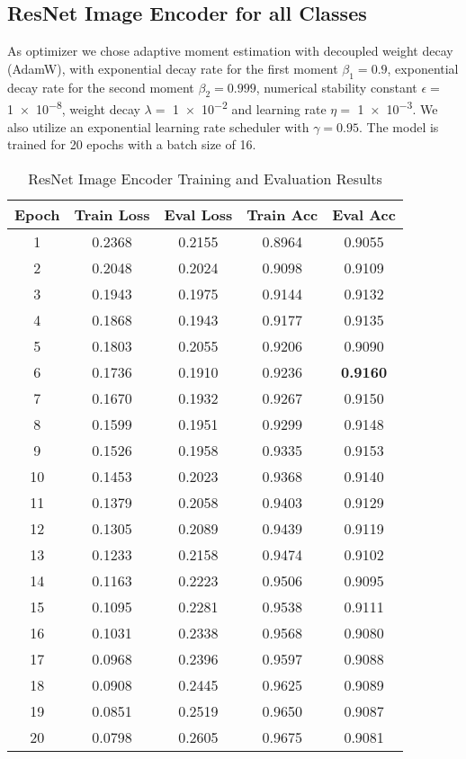 \documentclass{article}
\begin{document}
\subsection{ResNet Image Encoder for all Classes}
As optimizer we chose adaptive moment estimation with decoupled weight decay (AdamW),
with exponential decay rate for the first moment $\beta_1=0.9$, exponential decay rate for the second moment $\beta_2= 0.999$,
numerical stability constant $\epsilon =$ \num{1e-8}, weight decay $\lambda=$ \num{1e-2} and learning rate $\eta=$ \num{1e-3}.
We also utilize an exponential learning rate scheduler with $\gamma=0.95$. 
The model is trained for 20 epochs with a batch size of 16.
\begin{table}[H]
    \centering
    \caption{ResNet Image Encoder Training and Evaluation Results}
    \begin{tabular}{c|c|c|c|c}
    \hline
    \textbf{Epoch} & \textbf{Train Loss} & \textbf{Eval Loss} & \textbf{Train Acc} & \textbf{Eval Acc} \\
    \hline
    1  & 0.2368 & 0.2155 & 0.8964 & 0.9055 \\
    2  & 0.2048 & 0.2024 & 0.9098 & 0.9109 \\
    3  & 0.1943 & 0.1975 & 0.9144 & 0.9132 \\
    4  & 0.1868 & 0.1943 & 0.9177 & 0.9135 \\
    5  & 0.1803 & 0.2055 & 0.9206 & 0.9090 \\
    6  & 0.1736 & 0.1910 & 0.9236 & \bf{0.9160} \\
    7  & 0.1670 & 0.1932 & 0.9267 & 0.9150 \\
    8  & 0.1599 & 0.1951 & 0.9299 & 0.9148 \\
    9  & 0.1526 & 0.1958 & 0.9335 & 0.9153 \\
    10 & 0.1453 & 0.2023 & 0.9368 & 0.9140 \\
    11 & 0.1379 & 0.2058 & 0.9403 & 0.9129 \\
    12 & 0.1305 & 0.2089 & 0.9439 & 0.9119 \\
    13 & 0.1233 & 0.2158 & 0.9474 & 0.9102 \\
    14 & 0.1163 & 0.2223 & 0.9506 & 0.9095 \\
    15 & 0.1095 & 0.2281 & 0.9538 & 0.9111 \\
    16 & 0.1031 & 0.2338 & 0.9568 & 0.9080 \\
    17 & 0.0968 & 0.2396 & 0.9597 & 0.9088 \\
    18 & 0.0908 & 0.2445 & 0.9625 & 0.9089 \\
    19 & 0.0851 & 0.2519 & 0.9650 & 0.9087 \\
    20 & 0.0798 & 0.2605 & 0.9675 & 0.9081 \\
    \hline
    \end{tabular}
    \end{table}
\end{document}

